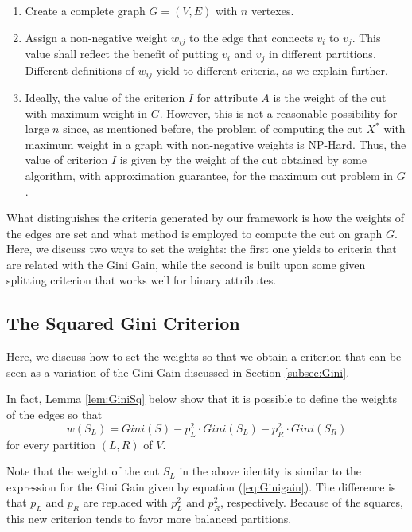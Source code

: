 \begin{enumerate}
\item  Create a complete graph $G=(V,E)$ with $n$ vertexes.

\item  Assign a non-negative weight $w_{ij}$ to the edge 
that connects $v_i$ to $v_j$. This value shall reflect the benefit of putting  $v_i$ and $v_j$ in different partitions.
Different definitions of $w_{ij}$ yield to different criteria,
as we explain further.

\item  Ideally, the value of the criterion $I$ for attribute
$A$ is the weight of the cut with maximum weight  in $G$.
However, this is not a reasonable possibility for large $n$ since, as mentioned before, the problem of computing the  cut $X^*$ with maximum weight in a graph with non-negative weights is NP-Hard.
Thus, the value of criterion $I$ is given by the weight
of the cut obtained by some  algorithm, with approximation guarantee, for the maximum cut
problem in $G$.   
\end{enumerate}

What distinguishes the  criteria
generated  by our framework
is how the weights of the edges are set and what 
method is employed to compute the cut on graph $G$.
Here, we discuss two ways to set the weights:
the first one yields to criteria that
are related with the Gini Gain, while the second 
is built upon some given splitting  criterion that works well for binary attributes.


\subsection{The Squared Gini Criterion}
Here, we discuss how to set the weights so that we obtain 
a criterion that can be seen as a variation of the Gini Gain discussed in Section \ref{subsec:Gini}.

In fact, Lemma \ref{lem:GiniSq} below  show that  it is possible to define the
weights of the edges so that 
\begin{equation}
 \label{lem:squaredgini}
w(S_L)= Gini(S) - p^2_L \cdot Gini(S_L) - p^2_R \cdot Gini(S_R) 
\end{equation}
for every partition $(L,R)$ of  $V$. 

Note that the weight of the cut  $S_L$ in the above identity 
is similar to the expression for
the Gini Gain given by equation (\ref{eq:Ginigain}).
The difference is that $p_L$ and $p_R$ are replaced with
$p_L^2$ and $p_R^2$, respectively.
Because of the squares, this new criterion tends to favor more balanced partitions. 

